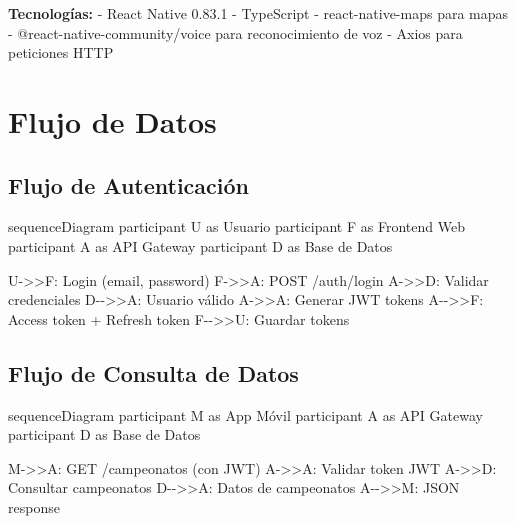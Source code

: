 \documentclass[
  spanish,
  11pt,
  letterpaper,
]{book}
\newenvironment{Shaded}{\begin{snugshade}}{\end{snugshade}}
\newcommand{\NormalTok}[1]{\textcolor[rgb]{0.00,0.23,0.31}{#1}}
\begin{document}
\textbf{Tecnologías:} - React Native 0.83.1 - TypeScript -
react-native-maps para mapas - @react-native-community/voice para
reconocimiento de voz - Axios para peticiones HTTP

\section{Flujo de Datos}\label{flujo-de-datos}

\subsection{Flujo de Autenticación}\label{flujo-de-autenticaciuxf3n}

\begin{Shaded}
\begin{Highlighting}[]
\NormalTok{sequenceDiagram}
\NormalTok{    participant U as Usuario}
\NormalTok{    participant F as Frontend Web}
\NormalTok{    participant A as API Gateway}
\NormalTok{    participant D as Base de Datos}
    
\NormalTok{    U{-}\textgreater{}\textgreater{}F: Login (email, password)}
\NormalTok{    F{-}\textgreater{}\textgreater{}A: POST /auth/login}
\NormalTok{    A{-}\textgreater{}\textgreater{}D: Validar credenciales}
\NormalTok{    D{-}{-}\textgreater{}\textgreater{}A: Usuario válido}
\NormalTok{    A{-}\textgreater{}\textgreater{}A: Generar JWT tokens}
\NormalTok{    A{-}{-}\textgreater{}\textgreater{}F: Access token + Refresh token}
\NormalTok{    F{-}{-}\textgreater{}\textgreater{}U: Guardar tokens}
\end{Highlighting}
\end{Shaded}

\subsection{Flujo de Consulta de
Datos}\label{flujo-de-consulta-de-datos}

\begin{Shaded}
\begin{Highlighting}[]
\NormalTok{sequenceDiagram}
\NormalTok{    participant M as App Móvil}
\NormalTok{    participant A as API Gateway}
\NormalTok{    participant D as Base de Datos}
    
\NormalTok{    M{-}\textgreater{}\textgreater{}A: GET /campeonatos (con JWT)}
\NormalTok{    A{-}\textgreater{}\textgreater{}A: Validar token JWT}
\NormalTok{    A{-}\textgreater{}\textgreater{}D: Consultar campeonatos}
\NormalTok{    D{-}{-}\textgreater{}\textgreater{}A: Datos de campeonatos}
\NormalTok{    A{-}{-}\textgreater{}\textgreater{}M: JSON response}
\end{Highlighting}
\end{Shaded}
\end{document}
